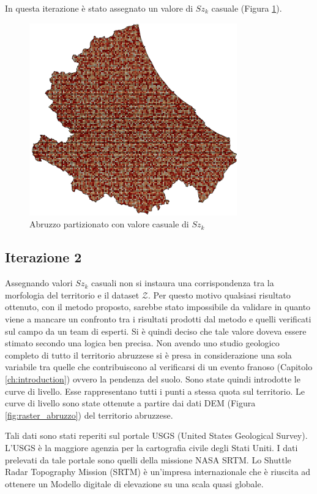 In questa iterazione è stato assegnato un valore di \textit{$Sz_k$} casuale (Figura \ref{fig:abruzzo_random}). 

\begin{figure}[H]
	\centering
	\includegraphics[width=0.8\textwidth]{images/AbruzzoRandom}
	\caption{Abruzzo partizionato con valore casuale di $Sz_k$}
	\label{fig:abruzzo_random}
\end{figure}


\subsection{\textbf{Iterazione 2}}
Assegnando valori $Sz_k$ casuali non si instaura una corrispondenza tra la morfologia del territorio e il dataset $\mathcal{Z}$. Per questo motivo qualsiasi risultato ottenuto, con il metodo proposto, sarebbe stato impossibile da validare in quanto viene a mancare un confronto tra i risultati prodotti dal metodo e quelli verificati sul campo da un team di esperti.    
Si è quindi deciso che tale valore doveva essere stimato secondo una logica ben precisa.
Non avendo uno studio geologico completo di tutto il territorio abruzzese si è presa in  considerazione una sola variabile tra quelle che contribuiscono al verificarsi di un evento franoso (Capitolo \ref{ch:introduction}) ovvero la pendenza del suolo. 
Sono state quindi introdotte le curve di livello. Esse rappresentano tutti i punti a stessa quota sul territorio. Le curve di livello  sono state ottenute a partire dai dati DEM (Figura \ref{fig:raster_abruzzo}) del territorio abruzzese.

Tali dati sono stati reperiti sul portale USGS (United States Geological Survey). L'USGS è la maggiore agenzia per la cartografia civile degli Stati Uniti. I dati prelevati da tale portale sono quelli della missione NASA SRTM.
Lo Shuttle Radar Topography Mission (SRTM) è un'impresa internazionale che è riuscita ad ottenere un Modello digitale di elevazione su una scala quasi globale. 

